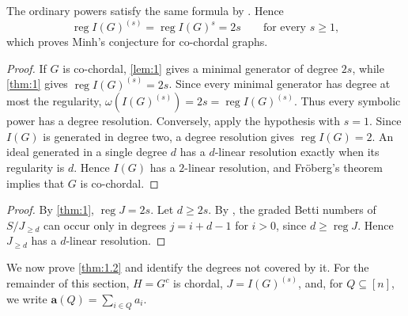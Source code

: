 \documentclass[11pt]{amsart}
\newtheorem{corollary}[theorem]{Corollary}
\theoremstyle{definition}
\newcommand{\reg}{\operatorname{reg}}
\begin{document}
The ordinary powers satisfy the same formula by \cite[Theorem~3.2]{HHZ}. Hence
\[
\reg I(G)^{(s)}=\reg I(G)^s=2s
\qquad\text{for every }s\ge1,
\]
which proves Minh's conjecture for co-chordal graphs.



\begin{proof}
If $G$ is co-chordal, \cref{lem:1} gives a minimal generator of degree $2s$, while \cref{thm:1} gives $\reg I(G)^{(s)}=2s$. Since every minimal generator has degree at most the regularity, $\omega(I(G)^{(s)})=2s=\reg I(G)^{(s)}$. Thus every symbolic power has a degree resolution. Conversely, apply the hypothesis with $s=1$. Since $I(G)$ is generated in degree two, a degree resolution gives $\reg I(G)=2$. An ideal generated in a single degree $d$ has a $d$-linear resolution exactly when its regularity is $d$. Hence $I(G)$ has a $2$-linear resolution, and Fr\"oberg's theorem \cite[Theorem~1]{Froberg} implies that $G$ is co-chordal.
\end{proof}


\begin{proof}
By \cref{thm:1}, $\reg J=2s$. Let $d\ge2s$. By \cite[Theorem~4.1]{AhmedFrobergNamiq}, the graded Betti numbers of $S/J_{\ge d}$ can occur only in degrees $j=i+d-1$ for $i>0$, since $d\ge\reg J$. Hence $J_{\ge d}$ has a $d$-linear resolution.
\end{proof}

We now prove \cref{thm:1.2} and identify the degrees not covered by it. For the remainder of this section, $H=G^c$ is chordal, $J=I(G)^{(s)}$, and, for $Q\subseteq[n]$, we write $\mathbf a(Q)=\sum_{i\in Q}a_i$.
\end{document}
